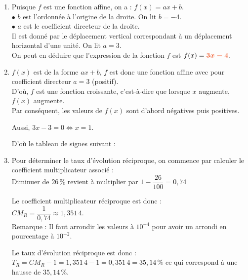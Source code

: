 \documentclass[a4paper,11pt]{article}
\newcounter{seancenum}
\newcounter{seancenumD}
\begin{document}
\setcounter{seancenumD}{11}
\newpage
\begin{seanceD}{} %
\begin{enumerate}
\item  Puisque $f$ est une fonction affine, on a : $f(x)=ax+b$.\\$\bullet$ $b$ est l'ordonnée à l'origine de la droite. On lit $b=-4$.\\$\bullet$ $a$ est le coefficient directeur de la droite.\\
          Il est donné par le déplacement vertical correspondant à un déplacement horizontal d'une unité. On lit $a=3$.\\ On peut en déduire que l'expression de la fonction $f$ est $f(x)={\color[HTML]{f15929}\boldsymbol{3x-4}}$.

\item  $f(x)$ est de la forme $ax+b$, $f$ est donc une fonction affine avec pour coefficient directeur  $a=3$  (positif).\\
             D'où, $f$ est une fonction  croissante, c'est-à-dire que lorsque $x$ augmente, $f(x)$  augmente. \\
             Par conséquent, les valeurs de $f(x)$ sont d'abord négatives puis positives.

\medskip

             Aussi, $3x-3=0 \iff x=1$.

\medskip
 D'où le tableau de signes suivant :\\

\item  Pour déterminer le taux d'évolution réciproque, on commence par calculer le coefficient multiplicateur associé :\\Diminuer de $26\,\%$ revient à multiplier par $ 1 - \dfrac{26}{100} = 0{,}74$ 

\medskip
Le coefficient multiplicateur réciproque est donc : \\$CM_R=\dfrac{1}{0{,}74} \approx 1{,}351\,4$.{\color[HTML]{f15929}\\Remarque : Il faut arrondir les valeurs à $10^{-4}$ pour avoir un arrondi en pourcentage à $10^{-2}$.}

\medskip
 Le taux d'évolution réciproque est donc : \\$T_R=CM_R-1=1{,}351\,4-1=0{,}351\,4=35{,}14\,\%$ ce qui correspond à une hausse de $35{,}14\,\%$.


\end{enumerate}
\end{seanceD}
\end{document}
